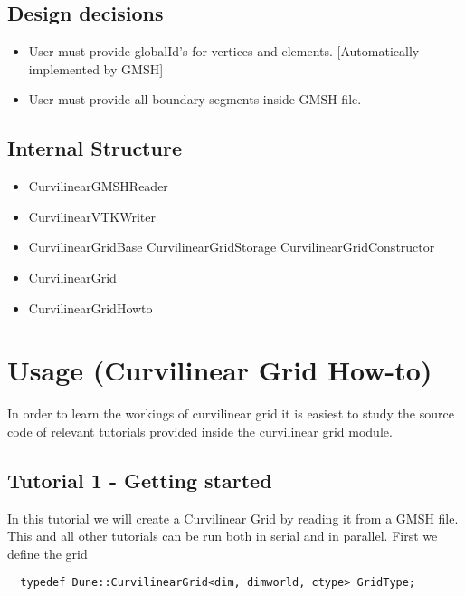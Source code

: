 \documentclass[12pt]{article}
\begin{document}
\subsection{Design decisions}

\begin{itemize}
	\item User must provide globalId's for vertices and elements. [Automatically implemented by GMSH]
	\item User must provide all boundary segments inside GMSH file.
\end{itemize}


\subsection{Internal Structure}

\begin{itemize}
	\item CurvilinearGMSHReader
	\item CurvilinearVTKWriter
	\item CurvilinearGridBase
		\subitem CurvilinearGridStorage
		\subitem CurvilinearGridConstructor
	\item CurvilinearGrid
	\item CurvilinearGridHowto
	
\end{itemize}











\section{Usage (Curvilinear Grid How-to)}
In order to learn the workings of curvilinear grid it is easiest to study the source code of relevant tutorials  provided inside the curvilinear grid module.

\subsection{Tutorial 1 - Getting started}

In this tutorial we will create a Curvilinear Grid by reading it from a GMSH file. This and all other tutorials can be run both in serial and in parallel.
First we define the grid \\

\begin{mybox}
\begin{lstlisting}
  typedef Dune::CurvilinearGrid<dim, dimworld, ctype> GridType;
\end{lstlisting}
\end{mybox}
\end{document}
